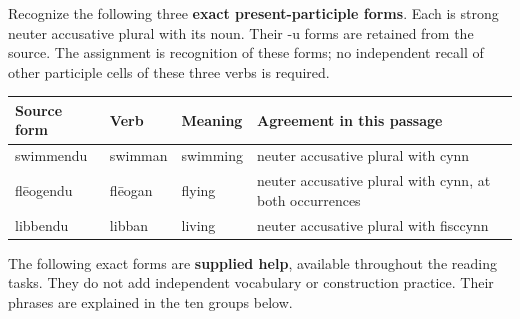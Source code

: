 Recognize the following three \textbf{exact present-participle forms}. Each is strong neuter accusative plural with its noun. Their -u forms are retained from the source. The assignment is recognition of these forms; no independent recall of other participle cells of these three verbs is required.

\par\begingroup
\fontsize{10.5}{13.2}\selectfont
\setlength{\LTleft}{0pt}\setlength{\LTright}{\fill}
\noindent
\begin{tabular}{@{}>{\raggedright\arraybackslash}p{21.01mm}>{\raggedright\arraybackslash}p{19.01mm}>{\raggedright\arraybackslash}p{19.01mm}>{\raggedright\arraybackslash}p{56.54mm}@{}}
\toprule
\textbf{Source form} & \textbf{Verb} & \textbf{Meaning} & \textbf{Agreement in this passage} \\
\midrule
swimmendu & swimman & swimming & neuter accusative plural with cynn \\
flēogendu & flēogan & flying & neuter accusative plural with cynn, at both occurrences \\
libbendu & libban & living & neuter accusative plural with fisccynn \\
\bottomrule
\end{tabular}
\par\endgroup

The following exact forms are \textbf{supplied help}, available throughout the reading tasks. They do not add independent vocabulary or construction practice. Their phrases are explained in the ten groups below.

